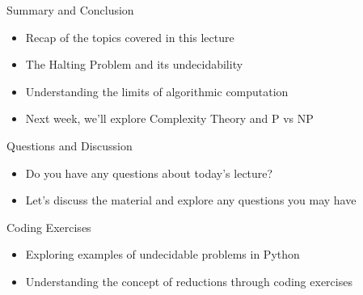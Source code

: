 \documentclass[presentation]{beamer}
\begin{document}
\begin{frame}[label={sec:org06e773e}]{Summary and Conclusion}
\begin{itemize}
\item Recap of the topics covered in this lecture
\item The Halting Problem and its undecidability
\item Understanding the limits of algorithmic computation
\item Next week, we'll explore Complexity Theory and P vs NP
\end{itemize}
\end{frame}

\begin{frame}[label={sec:orgc249939}]{Questions and Discussion}
\begin{itemize}
\item Do you have any questions about today's lecture?
\item Let's discuss the material and explore any questions you may have
\end{itemize}
\end{frame}

\begin{frame}[label={sec:orgb807646}]{Coding Exercises}
\begin{itemize}
\item Exploring examples of undecidable problems in Python
\item Understanding the concept of reductions through coding exercises
\end{itemize}
\end{frame}
\end{document}
